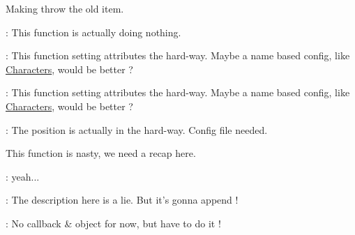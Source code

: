 
\begin{DoxyRefList}
\item[\label{todo__todo000001}%
\hypertarget{todo__todo000001}{}%
Member \hyperlink{class_characters_aee824830a67177342ae606f959fb0c7a}{Characters\-:\-:\-\_\-pickup\-Item} (int status)]Making throw the old item.  
\item[\label{todo__todo000004}%
\hypertarget{todo__todo000004}{}%
Member \hyperlink{class_consumable_adb866e69c3796edffad832b88e527518}{Consumable\-:\-:Begin\-Contact} (\hyperlink{class_elements}{Elements} $\ast$elem, b2\-Contact $\ast$contact)]\-: This function is actually doing nothing.  
\item[\label{todo__todo000002}%
\hypertarget{todo__todo000002}{}%
Member \hyperlink{class_consumable_ae374944f6333618dd08318b98b6950c7}{Consumable\-:\-:Consumable} ()]\-: This function setting attributes the hard-\/way. Maybe a name based config, like \hyperlink{class_characters}{Characters}, would be better ?  
\item[\label{todo__todo000003}%
\hypertarget{todo__todo000003}{}%
Member \hyperlink{class_consumable_adeca9f0d06a24fb2b76ddaa1396d1ddc}{Consumable\-:\-:Consumable} (\hyperlink{class_characters}{Characters} $\ast$c)]\-: This function setting attributes the hard-\/way. Maybe a name based config, like \hyperlink{class_characters}{Characters}, would be better ?  
\item[\label{todo__todo000005}%
\hypertarget{todo__todo000005}{}%
Member \hyperlink{class_equipment_a2bd67c4254f2074f4f7469f29a20e760}{Equipment\-:\-:Equipment} ()]\-: The position is actually in the hard-\/way. Config file needed.  
\item[\label{todo__todo000006}%
\hypertarget{todo__todo000006}{}%
Member \hyperlink{class_game_a194dbc017575c98bda4e2317d266a67e}{Game\-:\-:display\-H\-U\-D} (void)]This function is nasty, we need a recap here.  
\item[\label{todo__todo000007}%
\hypertarget{todo__todo000007}{}%
Member \hyperlink{class_hitbox_ae1b89c84071782c72ee6feb56c109c59}{Hitbox\-:\-:check\-Exists} (std\-::string)]\-: yeah...  
\item[\label{todo__todo000009}%
\hypertarget{todo__todo000009}{}%
Member \hyperlink{class_h_u_d_window_a1c6965adb9fdd22b230d20b26fef5ac0}{H\-U\-D\-Window\-:\-:armor} (void)]\-: The description here is a lie. But it's gonna append !  
\item[\label{todo__todo000010}%
\hypertarget{todo__todo000010}{}%
Member \hyperlink{class_h_u_d_window_acd4fdbfd1c2562384b84d3bcda80fea1}{H\-U\-D\-Window\-:\-:boots} (void)]\-: No callback \& object for now, but have to do it !  

\end{DoxyRefList}
